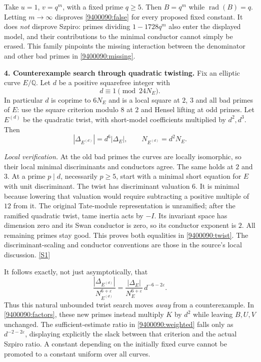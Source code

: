 \documentclass[11pt,a4paper]{article}
\newcommand{\Q}{\mathbb{Q}}
\newcommand{\sref}[2]{\hyperlink{source:#1:#2}{[S#2]}}
\numberwithin{equation}{section}
\begin{document}
Take $u=1$, $v=q^m$, with a fixed prime $q\geq5$. Then
$B=q^m$ while $\operatorname{rad}(B)=q$. Letting $m\to\infty$ disproves
\eqref{9400090:false} for every proposed fixed constant. It does \emph{not}
disprove Szpiro: primes dividing $1-1728q^m$ also enter the displayed model,
and their contributions to the minimal conductor cannot simply be erased.
This family pinpoints the missing interaction between the denominator and
other bad primes in \eqref{9400090:missing}.

\medskip
\textbf{4. Counterexample search through quadratic twisting.}
Fix an elliptic curve $E/\Q$. Let $d$ be a positive squarefree integer with
\[
 d\equiv1\pmod{24N_E}.
\]
In particular $d$ is coprime to $6N_E$ and is a local square at $2$, $3$ and
all bad primes of $E$: use the square criterion modulo $8$ at $2$ and Hensel
lifting at odd primes. Let $E^{(d)}$ be the quadratic twist, with short-model
coefficients multiplied by $d^2,d^3$. Then
\begin{equation}\label{9400090:twist}
 |\Delta_{E^{(d)}}|=d^6|\Delta_E|,
 \qquad N_{E^{(d)}}=d^2N_E.
\end{equation}

\emph{Local verification.} At the old bad primes the curves are locally
isomorphic, so their local minimal discriminants and conductors agree.
The same holds at $2$ and $3$. At a prime $p\mid d$, necessarily $p\geq5$,
start with a minimal short equation for $E$ with unit discriminant. The twist
has discriminant valuation $6$. It is minimal because lowering that valuation
would require subtracting a positive multiple of $12$ from it. The original
Tate-module representation is unramified; after the ramified quadratic twist,
tame inertia acts by $-I$. Its invariant space has dimension zero and its
Swan conductor is zero, so its conductor exponent is $2$. All remaining
primes stay good. This proves both equalities in \eqref{9400090:twist}.
The discriminant-scaling and conductor conventions are those in the
source's local discussion. \sref{9400090}{1}

It follows exactly, not just asymptotically, that
\begin{equation}\label{9400090:twist-ratio}
 \frac{|\Delta_{E^{(d)}}|}{N_{E^{(d)}}^{6+\varepsilon}}
 =\frac{|\Delta_E|}{N_E^{6+\varepsilon}}\,d^{-6-2\varepsilon}.
\end{equation}
Thus this natural unbounded twist search moves \emph{away} from a
counterexample. In \eqref{9400090:factors}, these new primes instead multiply
$K$ by $d^2$ while leaving $B,U,V$ unchanged. The sufficient-estimate ratio
in \eqref{9400090:weighted} falls only as $d^{-2-2\varepsilon}$, displaying
explicitly the slack between that criterion and the actual Szpiro ratio.
A constant depending on the initially fixed curve cannot be promoted to a
constant uniform over all curves.
\end{document}
